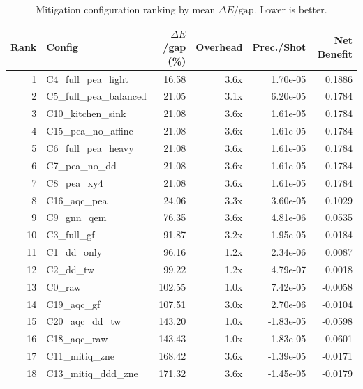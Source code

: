 \begin{table}[htbp]
  \centering
  \caption{Mitigation configuration ranking by mean $\Delta E / \text{gap}$. Lower is better.}
  \label{tab:mitigation_ranking}
  \begin{tabular}{r l r r r r}
    \toprule
    Rank & Config & $\Delta E$/gap (\%) & Overhead & Prec./Shot & Net Benefit \\
    \midrule
    1 & C4\_full\_pea\_light & 16.58 & 3.6x & 1.70e-05 & 0.1886 \\
    2 & C5\_full\_pea\_balanced & 21.05 & 3.1x & 6.20e-05 & 0.1784 \\
    3 & C10\_kitchen\_sink & 21.08 & 3.6x & 1.61e-05 & 0.1784 \\
    4 & C15\_pea\_no\_affine & 21.08 & 3.6x & 1.61e-05 & 0.1784 \\
    5 & C6\_full\_pea\_heavy & 21.08 & 3.6x & 1.61e-05 & 0.1784 \\
    6 & C7\_pea\_no\_dd & 21.08 & 3.6x & 1.61e-05 & 0.1784 \\
    7 & C8\_pea\_xy4 & 21.08 & 3.6x & 1.61e-05 & 0.1784 \\
    8 & C16\_aqc\_pea & 24.06 & 3.3x & 3.60e-05 & 0.1029 \\
    9 & C9\_gnn\_qem & 76.35 & 3.6x & 4.81e-06 & 0.0535 \\
    10 & C3\_full\_gf & 91.87 & 3.2x & 1.95e-05 & 0.0184 \\
    11 & C1\_dd\_only & 96.16 & 1.2x & 2.34e-06 & 0.0087 \\
    12 & C2\_dd\_tw & 99.22 & 1.2x & 4.79e-07 & 0.0018 \\
    13 & C0\_raw & 102.55 & 1.0x & 7.42e-05 & -0.0058 \\
    14 & C19\_aqc\_gf & 107.51 & 3.0x & 2.70e-06 & -0.0104 \\
    15 & C20\_aqc\_dd\_tw & 143.20 & 1.0x & -1.83e-05 & -0.0598 \\
    16 & C18\_aqc\_raw & 143.43 & 1.0x & -1.83e-05 & -0.0601 \\
    17 & C11\_mitiq\_zne & 168.42 & 3.6x & -1.39e-05 & -0.0171 \\
    18 & C13\_mitiq\_ddd\_zne & 171.32 & 3.6x & -1.45e-05 & -0.0179 \\
    \bottomrule
  \end{tabular}
\end{table}
